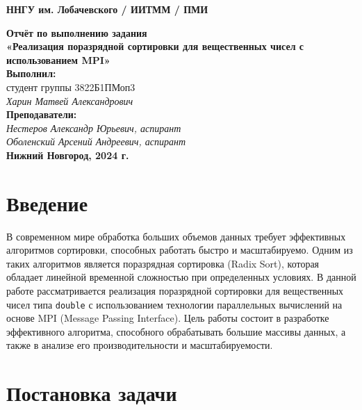 \documentclass[a4paper,12pt]{article}
\begin{document}
\begin{titlepage}
    \begin{center}
        \large 
        \textbf{ННГУ им. Лобачевского / ИИТММ / ПМИ}
        
        \vspace{4cm}
        \textbf{\Large Отчёт по выполнению задания}\\
        \textbf{\large «Реализация поразрядной сортировки для вещественных чисел с использованием MPI»}\\[3cm]
        
        \vspace{3cm}
        \textbf{Выполнил:}\\
        студент группы 3822Б1ПМоп3 \\
        \textit{Харин Матвей Александрович}\\[1cm]

        \textbf{Преподаватели:}\\
        \textit{Нестеров Александр Юрьевич, аспирант}\\
        \textit{Оболенский Арсений Андреевич, аспирант}\\[2cm]
        
        \vfill
        \textbf{Нижний Новгород, 2024 г.}
    \end{center}
\end{titlepage}


\tableofcontents
\newpage

\section{Введение}

В современном мире обработка больших объемов данных требует эффективных алгоритмов сортировки, способных работать быстро и масштабируемо. Одним из таких алгоритмов является поразрядная сортировка (Radix Sort), которая обладает линейной временной сложностью при определенных условиях. В данной работе рассматривается реализация поразрядной сортировки для вещественных чисел типа \texttt{double} с использованием технологии параллельных вычислений на основе MPI (Message Passing Interface). Цель работы состоит в разработке эффективного алгоритма, способного обрабатывать большие массивы данных, а также в анализе его производительности и масштабируемости.

\section{Постановка задачи}
\end{document}
